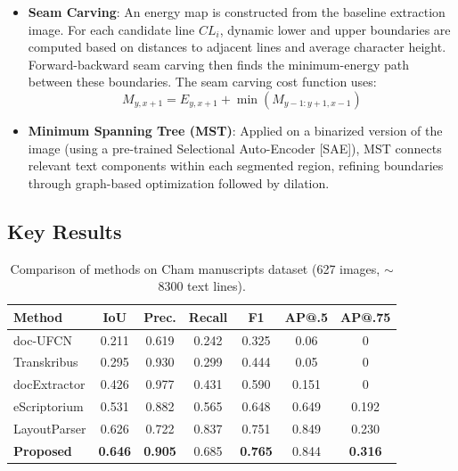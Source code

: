 \documentclass[11pt, a4paper]{article}
\begin{document}
\begin{itemize}[leftmargin=1.5em]
    \item \textbf{Seam Carving}: An energy map is constructed from the baseline extraction image. For each candidate line $CL_i$, dynamic lower and upper boundaries are computed based on distances to adjacent lines and average character height. Forward-backward seam carving then finds the minimum-energy path between these boundaries. The seam carving cost function uses:
    \begin{equation}
        M_{y,x+1} = E_{y,x+1} + \min(M_{y-1:y+1, x-1})
    \end{equation}
    
    \item \textbf{Minimum Spanning Tree (MST)}: Applied on a binarized version of the image (using a pre-trained Selectional Auto-Encoder [SAE]), MST connects relevant text components within each segmented region, refining boundaries through graph-based optimization followed by dilation.
\end{itemize}

\subsection{Key Results}

\begin{table}[H]
\centering
\caption{Comparison of methods on Cham manuscripts dataset (627 images, $\sim$8300 text lines).}
\begin{tabular}{lcccccc}
\toprule
\textbf{Method} & \textbf{IoU} & \textbf{Prec.} & \textbf{Recall} & \textbf{F1} & \textbf{AP@.5} & \textbf{AP@.75} \\
\midrule
doc-UFCN             & 0.211 & 0.619 & 0.242 & 0.325 & 0.06 & 0    \\
Transkribus           & 0.295 & 0.930 & 0.299 & 0.444 & 0.05 & 0    \\
docExtractor          & 0.426 & 0.977 & 0.431 & 0.590 & 0.151 & 0   \\
eScriptorium          & 0.531 & 0.882 & 0.565 & 0.648 & 0.649 & 0.192 \\
LayoutParser          & 0.626 & 0.722 & 0.837 & 0.751 & 0.849 & 0.230 \\
\textbf{Proposed}     & \textbf{0.646} & \textbf{0.905} & 0.685 & \textbf{0.765} & 0.844 & \textbf{0.316} \\
\bottomrule
\end{tabular}
\label{tab:cham_results}
\end{table}
\end{document}
